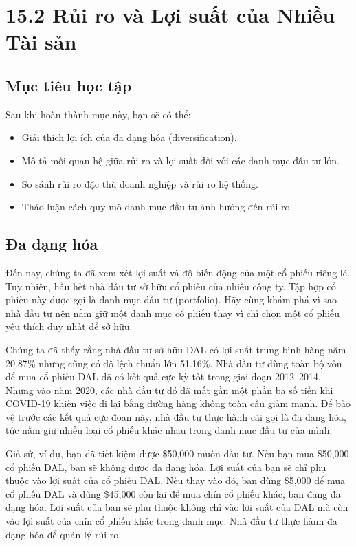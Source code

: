 \section{15.2 Rủi ro và Lợi suất của Nhiều Tài sản}

\subsection*{Mục tiêu học tập}
Sau khi hoàn thành mục này, bạn sẽ có thể:
\begin{itemize}
  \item Giải thích lợi ích của đa dạng hóa (diversification).
  \item Mô tả mối quan hệ giữa rủi ro và lợi suất đối với các danh mục đầu tư lớn.
  \item So sánh rủi ro đặc thù doanh nghiệp và rủi ro hệ thống.
  \item Thảo luận cách quy mô danh mục đầu tư ảnh hưởng đến rủi ro.
\end{itemize}

\subsection*{Đa dạng hóa}

Đến nay, chúng ta đã xem xét lợi suất và độ biến động của một cổ phiếu riêng lẻ. Tuy nhiên, hầu hết nhà đầu tư sở hữu cổ phiếu của nhiều công ty. Tập hợp cổ phiếu này được gọi là danh mục đầu tư (portfolio). Hãy cùng khám phá vì sao nhà đầu tư nên nắm giữ một danh mục cổ phiếu thay vì chỉ chọn một cổ phiếu yêu thích duy nhất để sở hữu.

Chúng ta đã thấy rằng nhà đầu tư sở hữu DAL có lợi suất trung bình hàng năm 20.87\% nhưng cũng có độ lệch chuẩn lớn 51.16\%. Nhà đầu tư dùng toàn bộ vốn để mua cổ phiếu DAL đã có kết quả cực kỳ tốt trong giai đoạn 2012--2014. Nhưng vào năm 2020, các nhà đầu tư đó đã mất gần một phần ba số tiền khi COVID-19 khiến việc đi lại bằng đường hàng không toàn cầu giảm mạnh. Để bảo vệ trước các kết quả cực đoan này, nhà đầu tư thực hành cái gọi là đa dạng hóa, tức nắm giữ nhiều loại cổ phiếu khác nhau trong danh mục đầu tư của mình.

Giả sử, ví dụ, bạn đã tiết kiệm được \$50,000 muốn đầu tư. Nếu bạn mua \$50,000 cổ phiếu DAL, bạn sẽ không được đa dạng hóa. Lợi suất của bạn sẽ chỉ phụ thuộc vào lợi suất của cổ phiếu DAL. Nếu thay vào đó, bạn dùng \$5,000 để mua cổ phiếu DAL và dùng \$45,000 còn lại để mua chín cổ phiếu khác, bạn đang đa dạng hóa. Lợi suất của bạn sẽ phụ thuộc không chỉ vào lợi suất của DAL mà còn vào lợi suất của chín cổ phiếu khác trong danh mục. Nhà đầu tư thực hành đa dạng hóa để quản lý rủi ro.

